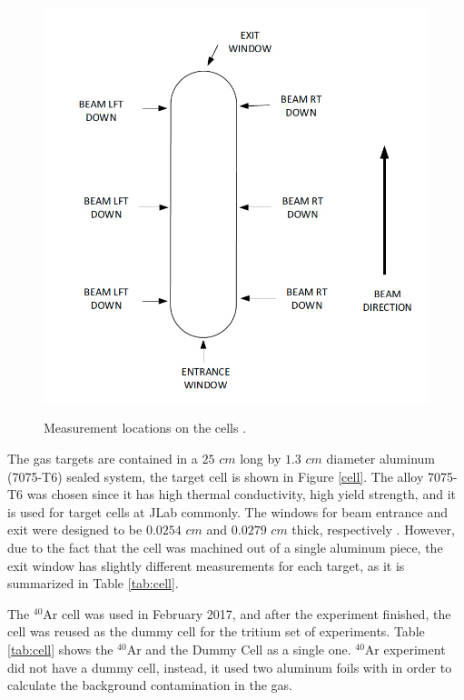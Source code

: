 \documentclass[final,5p,times,twocolumn,balance]{elsarticle}
\begin{document}
\begin{figure}[!h]
\centering
  \includegraphics[width=\linewidth]{images/tgt_measurements.png}\\
  \caption{Measurement locations on the cells \cite{cellconfig}. 
 }\label{fig:cellconfig}
\end{figure}

The gas targets are contained in a $25$ $cm$ long by $1.3$ $cm$ diameter aluminum (7075-T6) sealed system, the target cell is shown in Figure \ref{cell}. 
The alloy 7075-T6 was chosen since it has high thermal conductivity, high yield strength, and it is used for target cells at JLab commonly. 
The windows for beam entrance and exit were designed to be $0.0254$ $cm$ and $0.0279$ $cm$ thick, respectively \cite{celldes}. However, due to the fact that the cell was machined out of a single aluminum piece, the exit window has slightly different measurements for each target, as it is summarized in Table \ref{tab:cell}.

The $^{40}$Ar cell was used in February 2017, and after the experiment finished, the cell was reused as the dummy cell for the tritium set of experiments. Table \ref{tab:cell} shows the $^{40}$Ar and the Dummy Cell as a single one. $^{40}$Ar experiment did not have a dummy cell, instead, it used two aluminum foils with in order to calculate the background contamination in the gas.
\end{document}
